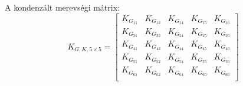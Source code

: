 \documentclass{article}
\begin{document}
		A kondenzált merevségi mátrix:
		\begin{equation}
		K_{G,K,5\times5}=
		\begin{bmatrix}
		K_{G_{11}}	 & K_{G_{12}}	 & K_{G_{14}} & K_{G_{15}}	 & K_{G_{16}}  \\
		K_{G_{21}}	 & K_{G_{22}}	 & K_{G_{24}} & K_{G_{25}}	 & K_{G_{26}}  \\
		K_{G_{41}}	 & K_{G_{42}}	 & K_{G_{44}} & K_{G_{45}}	 & K_{G_{46}}  \\
		K_{G_{51}}	 & K_{G_{52}}	 & K_{G_{54}} & K_{G_{55}}	 & K_{G_{56}}  \\
		K_{G_{61}}	 & K_{G_{62}}	 & K_{G_{64}} & K_{G_{65}}	 & K_{G_{66}}  \\
		\end{bmatrix}
		\end{equation}
		
\end{document}
